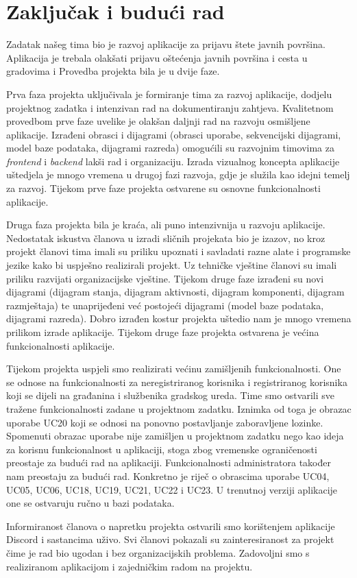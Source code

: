 \chapter{Zaključak i budući rad}
		
		Zadatak našeg tima bio je razvoj aplikacije za prijavu štete javnih površina. Aplikacija je trebala olakšati 
		prijavu oštećenja javnih površina i cesta u gradovima i Provedba projekta bila je u dvije faze.

		Prva faza projekta uključivala je formiranje tima za razvoj aplikacije, dodjelu projektnog zadatka i intenzivan
		rad na dokumentiranju zahtjeva. Kvalitetnom provedbom prve faze uvelike je olakšan daljnji rad na razvoju 
		osmišljene aplikacije. Izrađeni obrasci i dijagrami (obrasci uporabe, sekvencijski dijagrami, model baze podataka,
		dijagrami razreda) omogućili su razvojnim timovima za \textit{frontend} i \textit{backend} lakši rad i organizaciju.
		Izrada vizualnog koncepta aplikacije uštedjela je mnogo vremena u drugoj fazi razvoja, gdje je služila kao idejni 
		temelj za razvoj. Tijekom prve faze projekta ostvarene su osnovne funkcionalnosti aplikacije.

		Druga faza projekta bila je kraća, ali puno intenzivnija u razvoju aplikacije. Nedostatak iskustva članova u izradi
		sličnih projekata bio je izazov, no kroz projekt članovi tima imali su priliku upoznati i savladati razne alate i 
		programske jezike kako bi uspješno realizirali projekt. Uz tehničke vještine članovi su imali priliku razvijati 
		organizacijske vještine. Tijekom druge faze izrađeni su novi dijagrami (dijagram stanja, dijagram aktivnosti, dijagram
		komponenti, dijagram razmještaja) te unaprijeđeni već postojeći dijagrami (model baze podataka, dijagrami razreda).
		Dobro izrađen kostur projekta uštedio nam je mnogo vremena prilikom izrade aplikacije. Tijekom druge faze projekta ostvarena 
		je većina funkcionalnosti aplikacije.

		Tijekom projekta uspjeli smo realizirati većinu zamišljenih funkcionalnosti. One se odnose na funkcionalnosti za 
		neregistriranog korisnika i registriranog korisnika koji se dijeli na građanina i službenika gradskog ureda. Time 
		smo ostvarili sve tražene funkcionalnosti zadane u projektnom zadatku. Iznimka od toga je obrazac uporabe UC20 koji se 
		odnosi na ponovno postavljanje zaboravljene lozinke. Spomenuti obrazac uporabe nije zamišljen u projektnom zadatku nego
		kao ideja za korisnu funkcionalnost u aplikaciji, stoga zbog vremenske ograničenosti preostaje za budući rad na aplikaciji.
		Funkcionalnosti administratora također nam preostaju za budući rad. Konkretno je riječ o obrascima uporabe UC04, UC05,
		UC06, UC18, UC19, UC21, UC22 i UC23. U trenutnoj verziji aplikacije one se ostvaruju ručno u bazi podataka. 

		Informiranost članova o napretku projekta ostvarili smo korištenjem aplikacije Discord i sastancima uživo. Svi 
		članovi pokazali su zainteresiranost za projekt čime je rad bio ugodan i bez organizacijskih problema. Zadovoljni smo s
		realiziranom aplikacijom i zajedničkim radom na projektu.

		\eject 